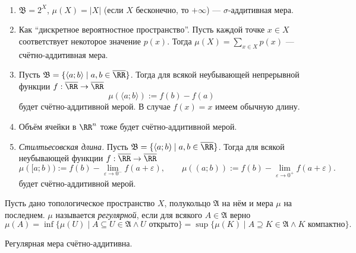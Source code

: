 \documentclass[12pt,a4paper]{article}
\begin{document}
    \begin{example}\ 
        \begin{enumerate}
            \item $\mathfrak{B} = 2^X$, $\mu(X) = |X|$ (если $X$ бесконечно, то $+\infty$) --- $\sigma$-аддитивная мера.
            \item Как ``дискретное вероятностное пространство''. Пусть каждой точке $x \in X$ соответствует некоторое значение $p(x)$. Тогда $\mu(X) = \sum_{x \in X} p(x)$ --- счётно-аддитивная мера.
            \item Пусть $\mathfrak{B} = \{\langle a; b \rangle \mid a, b \in \overline{\RR}\}$. Тогда для всякой неубывающей непрерывной функции $f: \overline{\RR} \to \overline{\RR}$
                \[\mu(\langle a; b \rangle) := f(b) - f(a)\]
                будет счётно-аддитивной мерой. В случае $f(x) = x$ имеем обычную длину.
            \item Объём ячейки в $\RR^n$ тоже будет счётно-аддитивной мерой.
            \item \emph{Стилтьесовская длина.} Пусть $\mathfrak{B} = \{\langle a; b) \mid a, b \in \overline{\RR}\}$. Тогда для всякой неубывающей функции $f: \overline{\RR} \to \overline{\RR}$
                \[
                    \mu([a; b)) := f(b) - \lim_{\varepsilon \to 0^-} f(a + \varepsilon),
                    \qquad
                    \mu((a; b)) := f(b) - \lim_{\varepsilon \to 0^+} f(a + \varepsilon).
                \]
                будет счётно-аддитивной мерой.
        \end{enumerate}
    \end{example}

    \begin{definition}
        Пусть дано топологическое пространство $X$, полукольцо $\mathfrak{A}$ на нём и мера $\mu$ на последнем. $\mu$ называется \emph{регулярной}, если для всякого $A \in \mathfrak{A}$ верно
        \[
            \mu(A)
            = \inf \{\mu(U) \mid A \subseteq U \in \mathfrak{A} \wedge U \text{ открыто}\}
            = \sup \{\mu(K) \mid A \supseteq K \in \mathfrak{A} \wedge K \text{ компактно}\}.
        \]
    \end{definition}

    \begin{theorem}[Александрова]
        Регулярная мера счётно-аддитивна.
    \end{theorem}
\end{document}
